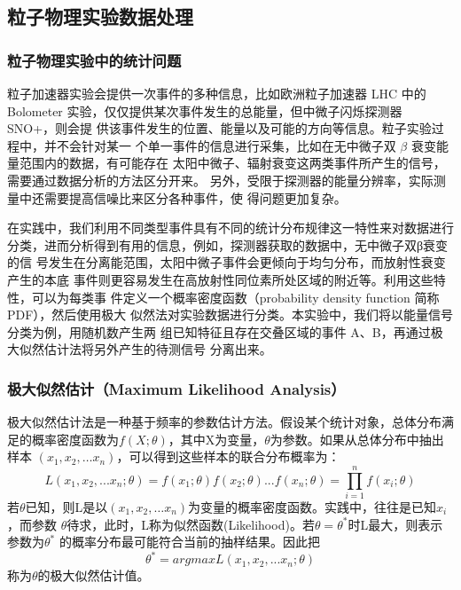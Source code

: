 \documentclass[10pt,a4paper,twoside,UTF8]{ctexart}
\begin{document}
\subsection{粒子物理实验数据处理}
\subsubsection{粒子物理实验中的统计问题}
粒子加速器实验会提供一次事件的多种信息，比如欧洲粒子加速器 LHC 中的
Bolometer 实验，仅仅提供某次事件发生的总能量，但中微子闪烁探测器 SNO+，则会提
供该事件发生的位置、能量以及可能的方向等信息。粒子实验过程中，并不会针对某一
个单一事件的信息进行采集，比如在无中微子双 $\beta$ 衰变能量范围内的数据，有可能存在
太阳中微子、辐射衰变这两类事件所产生的信号，需要通过数据分析的方法区分开来。
另外，受限于探测器的能量分辨率，实际测量中还需要提高信噪比来区分各种事件，使
得问题更加复杂。

在实践中，我们利用不同类型事件具有不同的统计分布规律这一特性来对数据进行
分类，进而分析得到有用的信息，例如，探测器获取的数据中，无中微子双β衰变的信
号发生在分离能范围，太阳中微子事件会更倾向于均匀分布，而放射性衰变产生的本底
事件则更容易发生在高放射性同位素所处区域的附近等。利用这些特性，可以为每类事
件定义一个概率密度函数（probability density function 简称 PDF），然后使用极大
似然法对实验数据进行分类。本实验中，我们将以能量信号分类为例，用随机数产生两
组已知特征且存在交叠区域的事件 A、B，再通过极大似然估计法将另外产生的待测信号
分离出来。

\subsubsection{极大似然估计（Maximum Likelihood Analysis）}
极大似然估计法是一种基于频率的参数估计方法。假设某个统计对象，总体分布满
足的概率密度函数为$f(X; \theta)$，其中X为变量，$\theta$为参数。如果从总体分布中抽出样本
$(x_1, x_2, … x_n)$，可以得到这些样本的联合分布概率为：
\begin{equation}
	L(x_1,x_2,... x_n;\theta)=f(x_1;\theta)f(x_2;\theta)... f(x_n;\theta)=\prod _{i = 1}^{n}f(x_i;\theta)  
\end{equation}
若$\theta$已知，则L是以$(x_1, x_2, … x_n)$为变量的概率密度函数。实践中，往往是已知$x_i$，而参数
$\theta$待求，此时，L称为似然函数(Likelihood)。若$\theta = \theta ^{*}$时L最大，则表示参数为$\theta ^{*}$
的概率分布最可能符合当前的抽样结果。因此把
\begin{equation}
	\theta ^{*}= arg max L(x_1,x_2,...x_n;\theta)
\end{equation}
称为$\theta$的极大似然估计值。
\end{document}
